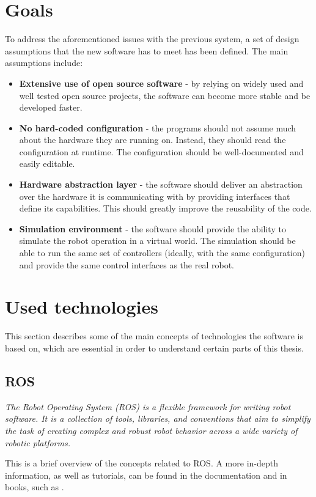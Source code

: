 \documentclass[english,inz,shortabstract]{iithesis}
\begin{document}
\section{Goals}
To address the aforementioned issues with the previous system, a set of design assumptions that the new software has to meet has been defined. The main assumptions include:

\begin{itemize}
    \item \textbf{Extensive use of open source software} - by relying on widely used and well tested open source projects, the software can become more stable and be developed faster.
    \item \textbf{No hard-coded configuration} - the programs should not assume much about the hardware they are running on. Instead, they should read the configuration at runtime. The configuration should be well-documented and easily editable.
    \item \textbf{Hardware abstraction layer} - the software should deliver an abstraction over the hardware it is communicating with by providing interfaces that define its capabilities. This should greatly improve the reusability of the code. 
    \item \textbf{Simulation environment} - the software should provide the ability to simulate the robot operation in a virtual world. The simulation should be able to run the same set of controllers (ideally, with the same configuration) and provide the same control interfaces as the real robot.
\end{itemize}


\section{Used technologies}
This section describes some of the main concepts of technologies the software is based on, which are essential in order to understand certain parts of this thesis.

    \subsection{ROS}
    \textit{The Robot Operating System (ROS) is a flexible framework for writing robot software. It is a collection of tools, libraries, and conventions that aim to simplify the task of creating complex and robust robot behavior across a wide variety of robotic platforms.}
    \cite{ros:about}

    This is a brief overview of the concepts related to ROS. A more in-depth information, as well as tutorials, can be found in the documentation \cite{ros:documentation} and in books, such as \cite{ros:mastering}.
\end{document}
